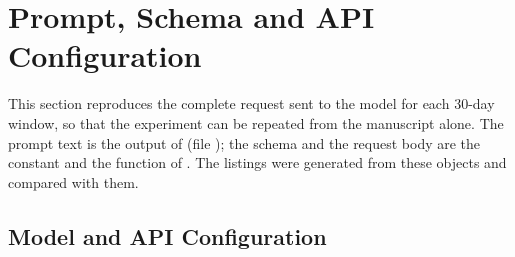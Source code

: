 \section{Prompt, Schema and API Configuration}
\label{sup:prompt}

This section reproduces the complete request sent to the model for each 30-day window, so that the experiment can be repeated from the manuscript alone. The prompt text is the output of  (file ); the schema and the request body are the constant  and the function  of . The listings were generated from these objects and compared with them.

\subsection{Model and API Configuration}
\label{app:prompt:config}

